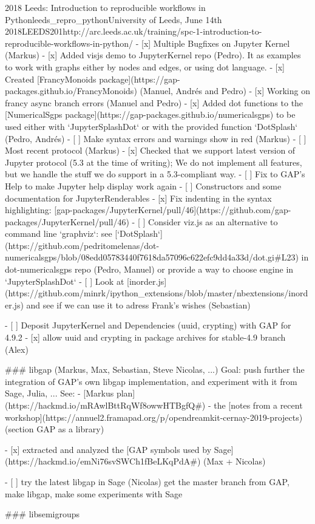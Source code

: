 \begin{Aim 1}
\begin{Aim 2}
\begin{event}{2018 Leeds: Introduction to reproducible workflows in Python}{leeds_repro_python}{University of Leeds, June 14th 2018}{LEEDS}{20}{1}{http://arc.leeds.ac.uk/training/spc-1-introduction-to-reproducible-workflows-in-python/}
- [x] Multiple Bugfixes on Jupyter Kernel (Markus)
- [x] Added visjs demo to JupyterKernel repo (Pedro). It as examples to work with graphs either by nodes and edges, or using dot language.
- [x] Created [FrancyMonoids package](https://gap-packages.github.io/FrancyMonoids) (Manuel, Andrés and Pedro)
- [x] Working on francy async branch errors (Manuel and Pedro) 
- [x] Added dot functions to the [NumericalSgps package](https://gap-packages.github.io/numericalsgps) to be used either with `JupyterSplashDot` or with the provided function `DotSplash` (Pedro, Andrés) 
- [ ] Make syntax errors and warnings show in red (Markus)
- [ ] Most recent protocol (Markus)
- [x] Checked that we support latest version of Jupyter protocol (5.3 at the time of writing); We do not implement all features, but we handle the stuff we do support in a 5.3-compliant way.
- [ ] Fix to GAP's Help to make Jupyter help display work again
- [ ]  Constructors and some documentation for JupyterRenderables
- [x] Fix indenting in the syntax highlighting: [gap-packages/JupyterKernel/pull/46](https://github.com/gap-packages/JupyterKernel/pull/46)
- [ ] Consider viz.js as an alternative to command line `graphviz`: see [`DotSplash`](https://github.com/pedritomelenas/dot-numericalsgps/blob/08edd05783440f7618da57096c622efc9dd4a33d/dot.gi#L23) in dot-numericalsgps repo (Pedro, Manuel) or provide a way to choose engine in `JupyterSplashDot`
- [ ] Look at [inorder.js](https://github.com/minrk/ipython_extensions/blob/master/nbextensions/inorder.js) and see if we can use it to adress Frank's wishes (Sebastian)


- [ ]  Deposit JupyterKernel and Dependencies (uuid, crypting) with GAP for 4.9.2
    - [x] allow uuid and crypting in package archives for stable-4.9 branch (Alex)


### libgap (Markus, Max, Sebastian, Steve Nicolas, ...)
Goal: push further the integration of GAP's own libgap implementation, and experiment with it from Sage, Julia, ...
See:
- [Markus plan](https://hackmd.io/mRAwlBttRqWf8owwHTBgfQ#)
- the [notes from a recent workshop](https://annuel2.framapad.org/p/opendreamkit-cernay-2019-projects) (section GAP as a library)

- [x] extracted and analyzed the [GAP symbols used by Sage](https://hackmd.io/emNi76svSWCh1fBeLKqPdA#) (Max + Nicolas)

- [ ] try the latest libgap in Sage (Nicolas)
      get the master branch from GAP, make libgap, make some experiments with Sage

### libsemigroups



\end{event}
\end{Aim 2}
\end{Aim 1}
